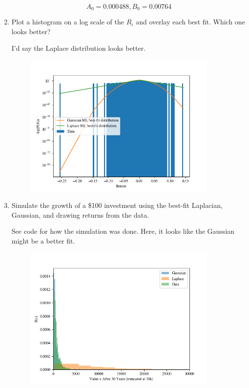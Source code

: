 \begin{enumerate}[label=\textbf{\Alph*}.]
    $$A_0=0.000488, B_0=0.00764$$

    \newpage
    \item Plot a histogram on a log scale of the $R_i$ and overlay each best fit. Which one looks better?

    I'd say the Laplace distribution looks better.
    \begin{figure}[H]
        \begin{center}
            \includegraphics[width=0.9\textwidth]{q1_return_hist.png}
        \end{center}
    \end{figure}
    \newpage
    \item Simulate the growth of a \$100 investment using the best-fit Laplacian, Gaussian, and drawing returns from the data.

    See code for how the simulation was done. Here, it looks like the Gaussian might be a better fit.
    \begin{figure}[H]
        \begin{center}
            \includegraphics[width=0.9\textwidth]{q1_generator_comparison.png}
        \end{center}
    \end{figure}

\end{enumerate}
